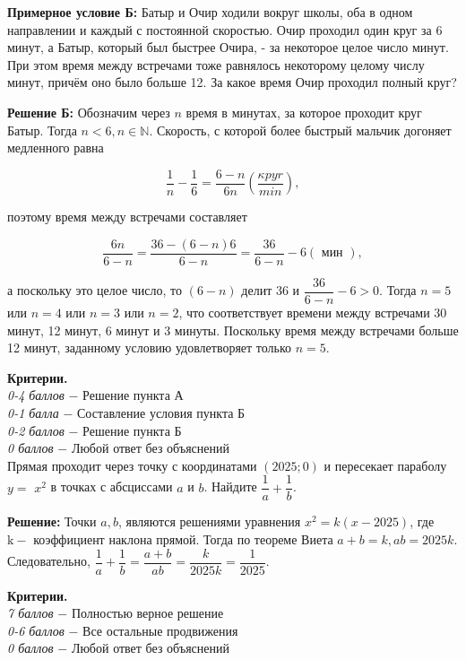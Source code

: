 \textbf{Примерное условие Б:} Батыр и Очир ходили вокруг школы, оба в одном направлении и каждый с постоянной скоростью. Очир проходил один круг за 6 минут, а Батыр, который был быстрее Очира, - за некоторое целое число минут. При этом время между встречами тоже равнялось некоторому целому числу минут, причём оно было больше 12. За какое время Очир проходил полный круг?

\textbf{Решение Б:} Обозначим через $n$ время в минутах, за которое проходит круг Батыр. Тогда $n<6, n \in \mathbb{N}$. Скорость, с которой более быстрый мальчик догоняет медленного равна

$$
\frac{1}{n}-\frac{1}{6}=\frac{6-n}{6 n}\left(\frac{\kappa p y r}{min}\right),
$$


поэтому время между встречами составляет

$$
\frac{6 n}{6-n}=\frac{36-(6-n)6}{6-n}=\frac{36}{6-n}-6(\text { мин }),
$$


а поскольку это целое число, то $(6-n)$ делит 36 и $\dfrac{36}{6-n}-6>0$. Тогда $n=5$ или $n=4$ или $n=3$ или $n=2$, что соответствует времени между встречами 30 минут, 12 минут, 6 минут и 3 минуты. Поскольку время между встречами больше 12 минут, заданному условию удовлетворяет только $n=5$.

\textbf{Критерии.} \\
\textit{0-4 баллов} $-$ Решение пункта А\\
\textit{0-1 балла} $-$ Составление условия пункта Б \\
\textit{0-2 баллов} $-$ Решение пункта Б\\
\textit{0 баллов} $-$ Любой ответ без объяснений\\


 Прямая проходит через точку с координатами $(2025 ; 0)$ и пересекает параболу $y=$ $x^2$ в точках с абсциссами $a$ и $b$. Найдите $\dfrac{1}{a}+\dfrac{1}{b}$.

\textbf{Решение:} Точки $a, b$, являются решениями уравнения $x^2=k(x-2025)$, где $\mathrm{k}-$ коэффициент наклона прямой. Тогда по теореме Виета $a+b=k, a b=2025 k$. Следовательно, $\dfrac{1}{a}+\dfrac{1}{b}=\dfrac{a+b}{a b}=\dfrac{k}{2025 k}=\dfrac{1}{2025}$.


\textbf{Критерии.} \\
\textit{7 баллов} $-$ Полностью верное решение\\
\textit{0-6 баллов} $-$ Все остальные продвижения\\
\textit{0 баллов} $-$ Любой ответ без объяснений\\


